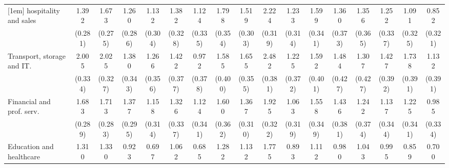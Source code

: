 {\begin{tabular}{l*{16}{c}}
[1em]
hospitality and sales&       1.392\sym{***}&       1.673\sym{***}&       1.260\sym{***}&       1.132\sym{***}&       1.382\sym{***}&       1.124\sym{***}&       1.798\sym{***}&       1.519\sym{***}&       2.224\sym{***}&       1.233\sym{***}&       1.599\sym{***}&       1.360\sym{***}&       1.356\sym{***}&       1.252\sym{***}&       1.091\sym{***}&       0.852\sym{**} \\
                    &     (0.281)         &     (0.275)         &     (0.286)         &     (0.304)         &     (0.328)         &     (0.335)         &     (0.354)         &     (0.303)         &     (0.319)         &     (0.314)         &     (0.341)         &     (0.373)         &     (0.365)         &     (0.337)         &     (0.325)         &     (0.321)         \\
[1em]
Transport, storage and IT.&       2.005\sym{***}&       2.025\sym{***}&       1.380\sym{***}&       1.266\sym{***}&       1.422\sym{***}&       0.972\sym{*}  &       1.585\sym{***}&       1.655\sym{***}&       2.482\sym{***}&       1.225\sym{***}&       1.592\sym{***}&       1.484\sym{***}&       1.307\sym{**} &       1.427\sym{***}&       1.738\sym{***}&       1.132\sym{**} \\
                    &     (0.334)         &     (0.327)         &     (0.343)         &     (0.356)         &     (0.377)         &     (0.378)         &     (0.400)         &     (0.355)         &     (0.381)         &     (0.372)         &     (0.401)         &     (0.427)         &     (0.427)         &     (0.392)         &     (0.391)         &     (0.391)         \\
[1em]
Financial and prof. serv.&       1.683\sym{***}&       1.713\sym{***}&       1.377\sym{***}&       1.158\sym{***}&       1.326\sym{***}&       1.124\sym{***}&       1.600\sym{***}&       1.367\sym{***}&       1.925\sym{***}&       1.063\sym{***}&       1.558\sym{***}&       1.436\sym{***}&       1.242\sym{***}&       1.137\sym{***}&       1.225\sym{***}&       0.985\sym{**} \\
                    &     (0.289)         &     (0.283)         &     (0.295)         &     (0.314)         &     (0.337)         &     (0.341)         &     (0.362)         &     (0.310)         &     (0.322)         &     (0.319)         &     (0.349)         &     (0.381)         &     (0.374)         &     (0.344)         &     (0.341)         &     (0.334)         \\
[1em]
Education and healthcare&       1.310\sym{***}&       1.330\sym{***}&       0.923\sym{**} &       0.697\sym{*}  &       1.062\sym{**} &       0.685\sym{*}  &       1.282\sym{***}&       1.132\sym{***}&       1.775\sym{***}&       0.893\sym{**} &       1.112\sym{**} &       0.980\sym{**} &       1.043\sym{**} &       0.995\sym{**} &       0.859\sym{*}  &       0.700\sym{*}  \\

\end{tabular}}
